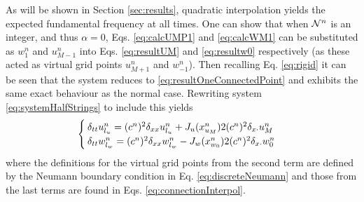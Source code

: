 As will be shown in Section \ref{sec:results}, quadratic interpolation yields the expected fundamental frequency at all times. One can show that when $\mathcal{N}^n$ is an integer, and thus $\alpha = 0$, Eqs. \eqref{eq:calcUMP1} and \eqref{eq:calcWM1} can be substituted as $w_1^n$ and $u_{M-1}^n$ into Eqs. \eqref{eq:resultUM} and \eqref{eq:resultw0} respectively (as these acted as virtual grid points $u_{M+1}^n$ and $w_{-1}^n$). Then recalling Eq. \eqref{eq:rigid} it can be seen that the system reduces to \eqref{eq:resultOneConnectedPoint} and exhibits the same exact behaviour as the normal case. %
Rewriting system \eqref{eq:systemHalfStrings} to include this yields
\begin{equation}\label{eq:FDSwithMethod}
    \begin{cases}
        \delta_{tt}u_{l_u}^n = (c^n)^2\delta_{xx}u_{l_u}^n + J_u(x_{u_M}^n)2(c^n)^2\delta_{x\cdot}u_M^n\\
        \delta_{tt}w_{l_w}^n = (c^n)^2\delta_{xx}w_{l_w}^n - J_w(x_{w_0}^n)2(c^n)^2\delta_{x\cdot}w_0^n
    \end{cases}
\end{equation}
where the definitions for the virtual grid points from the second term are defined by the Neumann boundary condition in Eq. \eqref{eq:discreteNeumann} and those from the last terms are found in Eqs. \eqref{eq:connectionInterpol}.

